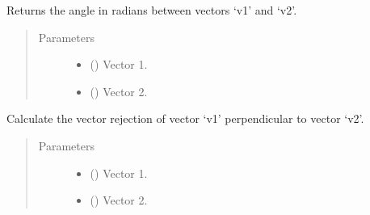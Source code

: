 \documentclass[letterpaper,10pt,english]{sphinxmanual}
\begin{document}
\begin{fulllineitems}
\label{\detokenize{utilities:acat.utilities.get_angle_between}}
Returns the angle in radians between vectors ‘v1’ and ‘v2’.
\begin{quote}\begin{description}
\item[{Parameters}] \leavevmode\begin{itemize}
\item {} 
 () \textendash{} Vector 1.

\item {} 
 () \textendash{} Vector 2.

\end{itemize}

\end{description}\end{quote}

\end{fulllineitems}


\begin{fulllineitems}
\label{\detokenize{utilities:acat.utilities.get_rejection_between}}
Calculate the vector rejection of vector ‘v1’ perpendicular
to vector ‘v2’.
\begin{quote}\begin{description}
\item[{Parameters}] \leavevmode\begin{itemize}
\item {} 
 () \textendash{} Vector 1.

\item {} 
 () \textendash{} Vector 2.

\end{itemize}

\end{description}\end{quote}

\end{fulllineitems}
\end{document}

